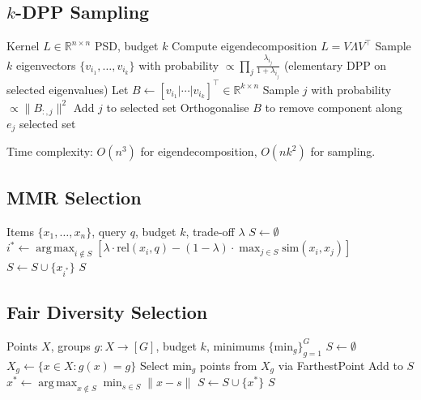 \documentclass[11pt]{article}
\DeclareMathOperator*{\argmax}{arg\,max}
\begin{document}
\subsection{$k$-DPP Sampling}

\begin{algorithm}[H]
\caption{$k$-DPP Sampling via Eigendecomposition}
\begin{algorithmic}[1]
\Require Kernel $L \in \mathbb{R}^{n \times n}$ PSD, budget $k$
\State Compute eigendecomposition $L = V \Lambda V^\top$
\State Sample $k$ eigenvectors $\{v_{i_1}, \ldots, v_{i_k}\}$ with
  probability $\propto \prod_{j} \frac{\lambda_{i_j}}{1 + \lambda_{i_j}}$
  (elementary DPP on selected eigenvalues)
\State Let $B \gets [v_{i_1} | \cdots | v_{i_k}]^\top \in \mathbb{R}^{k \times n}$
  \State Sample $j$ with probability $\propto \|B_{:,j}\|^2$
  \State Add $j$ to selected set
  \State Orthogonalise $B$ to remove component along $e_j$
\EndFor
\State \Return selected set
\end{algorithmic}
\end{algorithm}

Time complexity: $O(n^3)$ for eigendecomposition, $O(nk^2)$ for sampling.

\subsection{MMR Selection}

\begin{algorithm}[H]
\caption{Maximal Marginal Relevance}
\begin{algorithmic}[1]
\Require Items $\{x_1, \ldots, x_n\}$, query $q$, budget $k$, trade-off $\lambda$
\State $S \gets \emptyset$
  \State $i^* \gets \argmax_{i \notin S} \left[\lambda \cdot \text{rel}(x_i, q) - (1-\lambda) \cdot \max_{j \in S} \text{sim}(x_i, x_j)\right]$
  \State $S \gets S \cup \{x_{i^*}\}$
\EndFor
\State \Return $S$
\end{algorithmic}
\end{algorithm}

\subsection{Fair Diversity Selection}

\begin{algorithm}[H]
\caption{Two-Phase Fair Diversity Selection}
\begin{algorithmic}[1]
\Require Points $X$, groups $g: X \to [G]$, budget $k$, minimums $\{\text{min}_g\}_{g=1}^G$
\State $S \gets \emptyset$
 
  \State $X_g \gets \{x \in X : g(x) = g\}$
  \State Select $\text{min}_g$ points from $X_g$ via FarthestPoint
  \State Add to $S$
\EndFor
{} 
  \State $x^* \gets \argmax_{x \notin S} \min_{s \in S} \|x - s\|$
  \State $S \gets S \cup \{x^*\}$
\EndWhile
\State \Return $S$
\end{algorithmic}
\end{algorithm}
\end{document}
